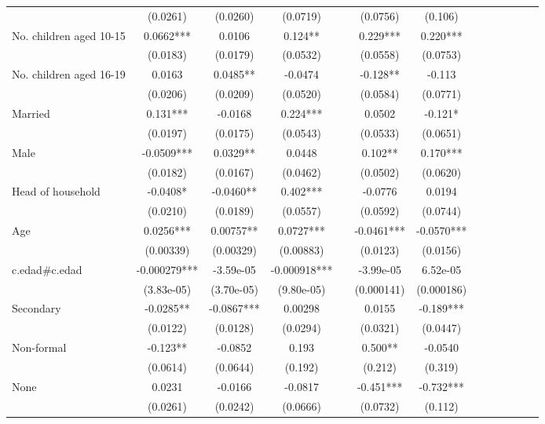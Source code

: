 \documentclass[]{article}
\begin{document}
\begin{tabular}{lcccccccccccc}
 & (0.0261) & (0.0260) & (0.0719) &  & (0.0756) & (0.106) &  &  &  &  &  &  \\
No. children aged 10-15 & 0.0662*** & 0.0106 & 0.124** &  & 0.229*** & 0.220*** &  &  &  &  &  &  \\
 & (0.0183) & (0.0179) & (0.0532) &  & (0.0558) & (0.0753) &  &  &  &  &  &  \\
No. children aged 16-19 & 0.0163 & 0.0485** & -0.0474 &  & -0.128** & -0.113 &  &  &  &  &  &  \\
 & (0.0206) & (0.0209) & (0.0520) &  & (0.0584) & (0.0771) &  &  &  &  &  &  \\
Married & 0.131*** & -0.0168 & 0.224*** &  & 0.0502 & -0.121* &  &  &  &  &  &  \\
 & (0.0197) & (0.0175) & (0.0543) &  & (0.0533) & (0.0651) &  &  &  &  &  &  \\
Male & -0.0509*** & 0.0329** & 0.0448 &  & 0.102** & 0.170*** &  &  &  &  &  &  \\
 & (0.0182) & (0.0167) & (0.0462) &  & (0.0502) & (0.0620) &  &  &  &  &  &  \\
Head of household & -0.0408* & -0.0460** & 0.402*** &  & -0.0776 & 0.0194 &  &  &  &  &  &  \\
 & (0.0210) & (0.0189) & (0.0557) &  & (0.0592) & (0.0744) &  &  &  &  &  &  \\
Age & 0.0256*** & 0.00757** & 0.0727*** &  & -0.0461*** & -0.0570*** &  &  &  &  &  &  \\
 & (0.00339) & (0.00329) & (0.00883) &  & (0.0123) & (0.0156) &  &  &  &  &  &  \\
c.edad\#c.edad & -0.000279*** & -3.59e-05 & -0.000918*** &  & -3.99e-05 & 6.52e-05 &  &  &  &  &  &  \\
 & (3.83e-05) & (3.70e-05) & (9.80e-05) &  & (0.000141) & (0.000186) &  &  &  &  &  &  \\
Secondary & -0.0285** & -0.0867*** & 0.00298 &  & 0.0155 & -0.189*** &  &  &  &  &  &  \\
 & (0.0122) & (0.0128) & (0.0294) &  & (0.0321) & (0.0447) &  &  &  &  &  &  \\
Non-formal & -0.123** & -0.0852 & 0.193 &  & 0.500** & -0.0540 &  &  &  &  &  &  \\
 & (0.0614) & (0.0644) & (0.192) &  & (0.212) & (0.319) &  &  &  &  &  &  \\
None & 0.0231 & -0.0166 & -0.0817 &  & -0.451*** & -0.732*** &  &  &  &  &  &  \\
 & (0.0261) & (0.0242) & (0.0666) &  & (0.0732) & (0.112) &  &  &  &  &  &  \\

\end{tabular}
\end{document}
